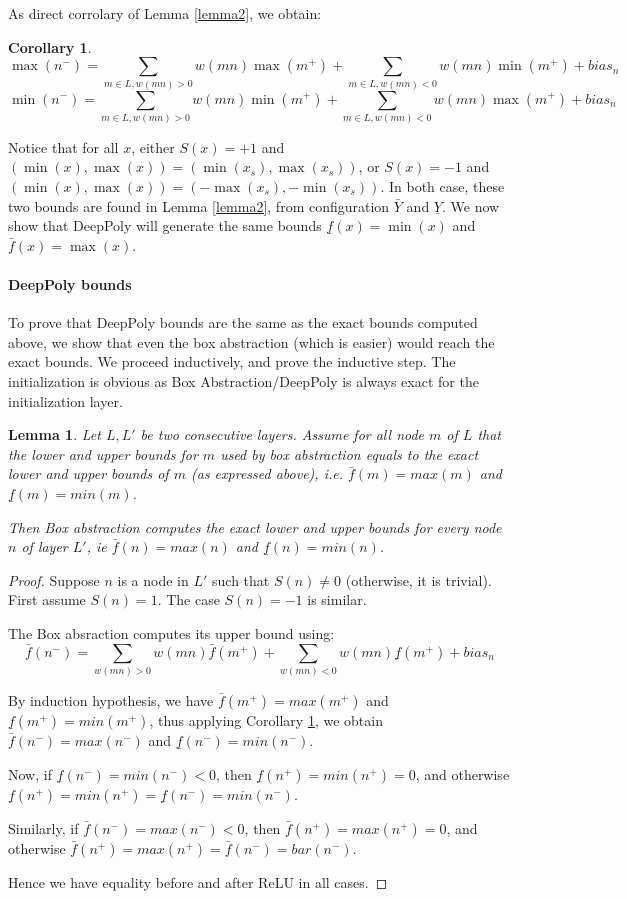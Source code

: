 \documentclass[]{article}
\newtheorem{lemma}{Lemma}
\newtheorem{corollary}{Corollary}
\theoremstyle{definition}
\begin{document}
As direct corrolary of Lemma \ref{lemma2}, we obtain:

\begin{corollary}
	\label{cor1}
	$$\max(n^-)=\sum_{m \in L, w(m n)>0}w(m n) \max(m^+) + \sum_{m \in L, w(m n)<0}w(m n) \min(m^+) + bias_n$$
	$$\min(n^-)=\sum_{m \in L, w(m n)>0}w(m n) \min(m^+) + \sum_{m \in L, w(m n)<0}w(m n) \max(m^+) + bias_n$$
\end{corollary}
	

Notice that for all $x$, either $S(x)=+1$ and 
$(\min(x),\max(x))=(\min(x_s),\max(x_s))$, 
or $S(x)=-1$ and $(\min(x),\max(x))=(-\max(x_s),-\min(x_s))$.
In both case, these two bounds are found in Lemma \ref{lemma2},
from configuration $\bar{Y}$ and $\underline{Y}$.
We now show that DeepPoly will generate the same bounds 
$\underline{f}(x)=\min(x)$ and $\bar{f}(x)=\max(x)$.

\paragraph{DeepPoly bounds}

To prove that DeepPoly bounds are the same as the exact bounds computed above, 
we show that even the box abstraction (which is easier) would reach the exact bounds.
We proceed inductively, and prove the inductive step.
The initialization is obvious as Box Abstraction/DeepPoly is always exact for the initialization layer.

\begin{lemma}
	Let $L,L'$ be two consecutive layers.
	Assume for all node $m$ of $L$ that the lower and upper bounds for $m$ used by box abstraction equals to the exact lower and upper bounds of $m$ (as expressed above), i.e.
	$\bar{f}(m)=max(m)$ and $\underline{f}(m)=min(m)$.
	
	Then Box abstraction computes the exact lower and upper bounds for every node $n$ of layer $L'$, ie $\bar{f}(n)=max(n)$ and $\underline{f}(n)=min(n)$.
\end{lemma}

\begin{proof}
	Suppose $n$ is a node in $L'$ such that $S(n)\neq 0$ (otherwise, it is trivial). 
	First assume $S(n)=1$. The case $S(n)=-1$ is similar. 

	The Box absraction computes its upper bound using:
	$$\bar{f}(n^-)= \sum_{w(mn)>0} w(mn) \bar{f}(m^+) + \sum_{w(mn)<0} w(mn) \underline{f}(m^+) + bias_n$$

	By induction hypothesis, we have 
	$\bar{f}(m^+)=max(m^+)$ and
	$\underline{f}(m^+)=min(m^+)$, thus 
	applying Corollary \ref{cor1}, we obtain
	$\bar{f}(n^-)=max(n^-)$ and 
	$\underline{f}(n^-)=min(n^-)$.

	Now, if $\underline{f}(n^-)=min(n^-)<0$, 
	then $\underline{f}(n^+)=min(n^+)=0$, 
	and otherwise 
	$\underline{f}(n^+)=min(n^+)=\underline{f}(n^-)=min(n^-)$.

	Similarly, 
	if $\bar{f}(n^-)=max(n^-)<0$, 
	then $\bar{f}(n^+)=max(n^+)=0$, 
	and otherwise 
	$\bar{f}(n^+)=max(n^+)=\bar{f}(n^-)=bar(n^-)$.
	
	Hence we have equality before and after ReLU in all cases.
\end{proof}
\end{document}
